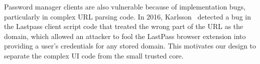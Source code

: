 Password manager clients are also vulnerable because of implementation bugs, particularly in complex URL parsing code. In 2016, Karlsson~\cite{URLParsingBug} detected a bug in the Lastpass client script code that treated the wrong part of the URL as the domain, which allowed an attacker to fool the LastPass browser extension into providing a user's credentials for any stored domain.  This motivates our design to separate the complex UI code from the small trusted core.





